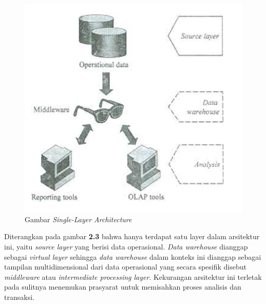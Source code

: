 \begin{figure}[h]
	\centering
	\includegraphics[scale=0.75]{Gambar/single-layer}
	\caption{Gambar \textit{Single-Layer Architecture}\cite{Matteo:2009}}
	\end{figure}
	Diterangkan pada gambar \textbf{2.3} bahwa hanya terdapat satu layer dalam arsitektur ini, yaitu \textit{source layer} yang berisi data operasional. \textit{Data warehouse} dianggap sebagai \textit{virtual layer} sehingga \textit{data warehouse} dalam konteks ini dianggap sebagai tampilan multidimensional dari data operasional yang secara spesifik disebut \textit{middleware} atau \textit{intermediate processing layer}. Kekurangan arsitektur ini terletak pada sulitnya menemukan prasyarat untuk memisahkan proses analisis dan transaksi.\cite{Matteo:2009}
	
